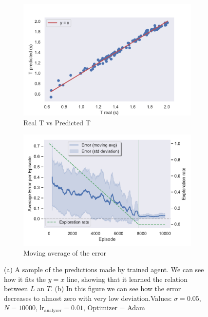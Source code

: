 \documentclass[11pt,a4paper,twoside]{report}
\newcommand{\+}{\textnormal{+} }
\theoremstyle{definition}
\numberwithin{equation}{chapter}
\begin{document}
  
\begin{figure}[t]
  \centering
  \begin{subfigure}{.5\textwidth}
    \centering
    \includegraphics[width=1\linewidth]{figures/Real-vs-Pred-Pendulum.pdf}
    \caption{Real T vs Predicted T}
    \label{fig:RealvsPredictedPendulum}
  \end{subfigure}%
  \begin{subfigure}{.5\textwidth}
    \centering
    \includegraphics[width=1\linewidth]{figures/Error-Pendulum.pdf}
    \caption{Moving average of the error}
    \label{fig:ErrorAveragePendulum}
  \end{subfigure}
  \caption{(a) A sample of the predictions made by trained agent. We can see
  how it fits the $y=x$ line, showing that it learned the relation between
  $L$ an $T$. (b) In this figure we can see how the error decreases to almost 
  zero with very low deviation.Values: $\sigma=0.05$, $N=10000$,
  $\text{lr}_\text{analyzer}=0.01$, Optimizer = Adam
  }
  \label{fig:PendulumError}
  \end{figure}
\end{document}
